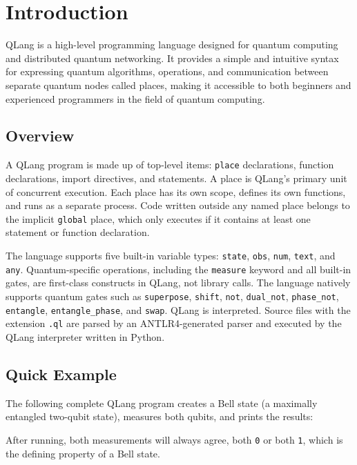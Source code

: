 \section{Introduction}\label{sec:introduction}
QLang is a high-level programming language designed for quantum computing and distributed quantum networking. 
It provides a simple and intuitive syntax for expressing quantum algorithms, operations, and communication between separate quantum nodes called places, 
making it accessible to both beginners and experienced programmers in the field of quantum computing.


\subsection{Overview}\label{sec:overview}
A QLang program is made up of top-level items: \texttt{place} declarations,
function declarations, import directives, and statements. A place is QLang's
primary unit of concurrent execution. Each place has its own scope, defines
its own functions, and runs as a separate process. Code written outside any
named place belongs to the implicit \texttt{global} place, 
which only executes if it contains at least one statement
or function declaration.

The language supports five built-in variable types: \texttt{state},
\texttt{obs}, \texttt{num}, \texttt{text}, and \texttt{any}. Quantum-specific operations,
including the \texttt{measure} keyword and all built-in gates, are first-class constructs 
in QLang, not library calls. The language natively supports quantum gates such as 
\texttt{superpose}, \texttt{shift}, \texttt{not}, \texttt{dual\_not}, \texttt{phase\_not}, 
\texttt{entangle}, \texttt{entangle\_phase}, and \texttt{swap}.
QLang is interpreted. Source files with the extension \texttt{.ql}
are parsed by an ANTLR4-generated parser and executed by the QLang interpreter
written in Python.


\subsection{Quick Example}\label{sec:quick-example}
The following complete QLang program creates a Bell state (a maximally
entangled two-qubit state), measures both qubits, and prints the results:

After running, both measurements will always agree, both \texttt{0} or both
\texttt{1}, which is the defining property of a Bell state.

